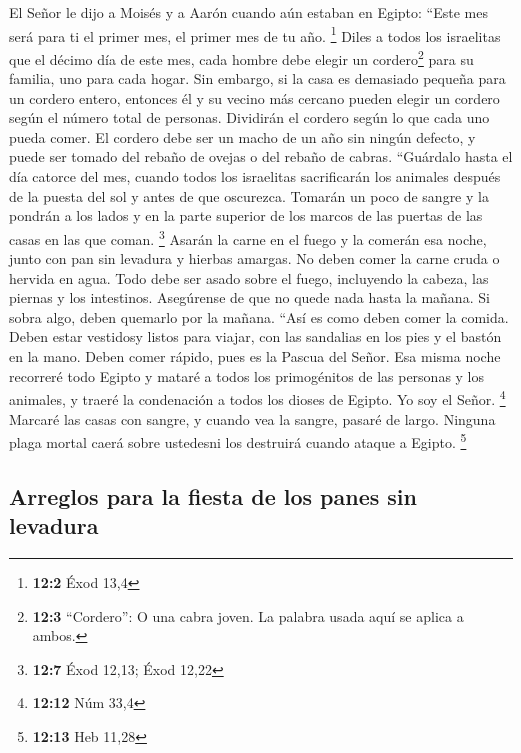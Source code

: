  El Señor le dijo a Moisés y a Aarón cuando aún estaban en
Egipto:  ``Este mes será para ti el primer mes, el primer
mes de tu año. \footnote{\textbf{12:2} Éxod 13,4}  Diles a
todos los israelitas que el décimo día de este mes, cada hombre debe
elegir un cordero\footnote{\textbf{12:3} ``Cordero'': O una cabra joven.
  La palabra usada aquí se aplica a ambos.} para su familia, uno para
cada hogar.  Sin embargo, si la casa es demasiado pequeña
para un cordero entero, entonces él y su vecino más cercano pueden
elegir un cordero según el número total de personas. Dividirán el
cordero según lo que cada uno pueda comer.  El cordero
debe ser un macho de un año sin ningún defecto, y puede ser tomado del
rebaño de ovejas o del rebaño de cabras.  ``Guárdalo hasta
el día catorce del mes, cuando todos los israelitas sacrificarán los
animales después de la puesta del sol y antes de que oscurezca.
 Tomarán un poco de sangre y la pondrán a los lados y en
la parte superior de los marcos de las puertas de las casas en las que
coman. \footnote{\textbf{12:7} Éxod 12,13; Éxod 12,22} 
Asarán la carne en el fuego y la comerán esa noche, junto con pan sin
levadura y hierbas amargas.  No deben comer la carne cruda
o hervida en agua. Todo debe ser asado sobre el fuego, incluyendo la
cabeza, las piernas y los intestinos.  Asegúrense de que
no quede nada hasta la mañana. Si sobra algo, deben quemarlo por la
mañana.  ``Así es como deben comer la comida. Deben estar
vestidosy listos para viajar, con las sandalias en los pies y el bastón
en la mano. Deben comer rápido, pues es la Pascua del Señor.
 Esa misma noche recorreré todo Egipto y mataré a todos
los primogénitos de las personas y los animales, y traeré la condenación
a todos los dioses de Egipto. Yo soy el Señor. \footnote{\textbf{12:12}
  Núm 33,4}  Marcaré las casas con sangre, y cuando vea
la sangre, pasaré de largo. Ninguna plaga mortal caerá sobre ustedesni
los destruirá cuando ataque a Egipto. \footnote{\textbf{12:13} Heb 11,28}

\hypertarget{arreglos-para-la-fiesta-de-los-panes-sin-levadura}{%
\subsection{Arreglos para la fiesta de los panes sin
levadura}\label{arreglos-para-la-fiesta-de-los-panes-sin-levadura}}

